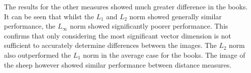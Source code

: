 \begin{appendices}
The results for the other measures showed much greater difference in the books. It can be seen that whilst the $L_1$ and $L_2$ norm showed generally similar performance, the $L_\infty$ norm showed significantly poorer performance. This confirms that only considering the most significant vector dimension is not sufficient to accurately determine differences between the images. The $L_2$ norm also outperformed the $L_1$ norm in the average case for the books. The image of the sheep however showed similar performance between distance measures.

\end{appendices}